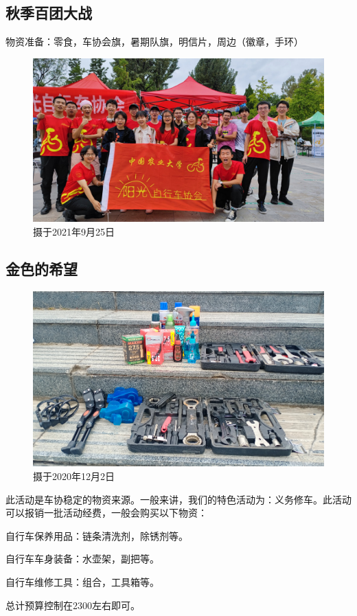 \documentclass{ctexbook}
\begin{document}
\subsection{秋季百团大战}
物资准备：零食，车协会旗，暑期队旗，明信片，周边（徽章，手环）
\begin{figure}[H]
    \centering
    \includegraphics[width=0.7\linewidth]{fig/百团大战}
    \caption{摄于2021年9月25日}
    \label{fig:百团大战}
\end{figure}

\subsection{金色的希望}
\begin{figure}[htp]
    \centering
    \includegraphics[width=0.7\linewidth]{fig/金色的希望}
    \caption{摄于2020年12月2日}
    \label{fig:}
\end{figure}

此活动是车协稳定的物资来源。一般来讲，我们的特色活动为：义务修车。此活动可以报销一批活动经费，一般会购买以下物资：

自行车保养用品：链条清洗剂，除锈剂等。

自行车车身装备：水壶架，副把等。

自行车维修工具：组合，工具箱等。

总计预算控制在2300左右即可。
\end{document}
